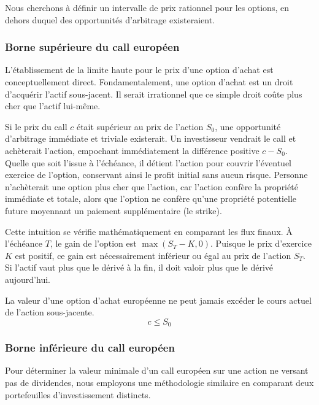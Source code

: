 Nous cherchons à définir un intervalle de prix rationnel pour les options, en dehors duquel des opportunités d'arbitrage existeraient.

\subsubsection{Borne supérieure du call européen}

L'établissement de la limite haute pour le prix d'une option d'achat est conceptuellement direct. Fondamentalement, une option d'achat est un droit d'acquérir l'actif sous-jacent. Il serait irrationnel que ce simple droit coûte plus cher que l'actif lui-même.

\begin{intuitionbox}
Si le prix du call $c$ était supérieur au prix de l'action $S_0$, une opportunité d'arbitrage immédiate et triviale existerait. Un investisseur vendrait le call et achèterait l'action, empochant immédiatement la différence positive $c - S_0$. Quelle que soit l'issue à l'échéance, il détient l'action pour couvrir l'éventuel exercice de l'option, conservant ainsi le profit initial sans aucun risque. Personne n'achèterait une option plus cher que l'action, car l'action confère la propriété immédiate et totale, alors que l'option ne confère qu'une propriété potentielle future moyennant un paiement supplémentaire (le strike).
\end{intuitionbox}

Cette intuition se vérifie mathématiquement en comparant les flux finaux. À l'échéance $T$, le gain de l'option est $\max(S_T - K, 0)$. Puisque le prix d'exercice $K$ est positif, ce gain est nécessairement inférieur ou égal au prix de l'action $S_T$. Si l'actif vaut plus que le dérivé à la fin, il doit valoir plus que le dérivé aujourd'hui.

\begin{theorembox}
La valeur d'une option d'achat européenne ne peut jamais excéder le cours actuel de l'action sous-jacente.
$$ c \le S_0 $$
\end{theorembox}

\subsubsection{Borne inférieure du call européen}

Pour déterminer la valeur minimale d'un call européen sur une action ne versant pas de dividendes, nous employons une méthodologie similaire en comparant deux portefeuilles d'investissement distincts.

